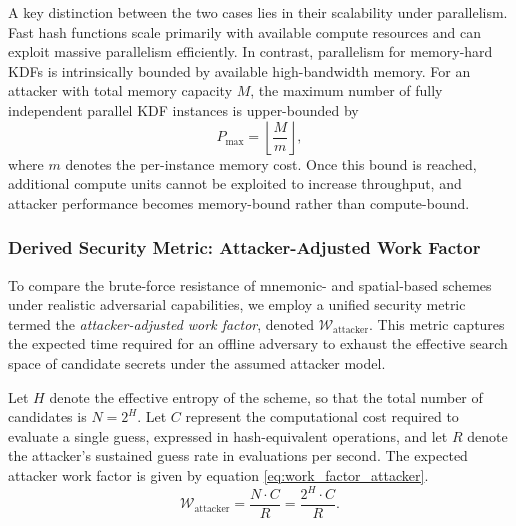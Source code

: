 \documentclass[journal,article,submit,pdftex,moreauthors]{Definitions/mdpi}
\begin{document}
A key distinction between the two cases lies in their scalability under parallelism. Fast hash functions scale primarily with available compute resources and can exploit massive parallelism efficiently. In contrast, parallelism for memory-hard KDFs is intrinsically bounded by available high-bandwidth memory. For an attacker with total memory capacity $M$, the maximum number of fully independent parallel KDF instances is upper-bounded by
\[
P_{\max} = \left\lfloor \frac{M}{m} \right\rfloor ,
\]
where $m$ denotes the per-instance memory cost. Once this bound is reached, additional compute units cannot be exploited to increase throughput, and attacker performance becomes memory-bound rather than compute-bound.

\subsubsection{Derived Security Metric: Attacker-Adjusted Work Factor}

To compare the brute-force resistance of mnemonic- and spatial-based schemes under realistic adversarial capabilities, we employ a unified security metric termed the \emph{attacker-adjusted work factor}, denoted $\mathcal{W}_{\text{attacker}}$. This metric captures the expected time required for an offline adversary to exhaust the effective search space of candidate secrets under the assumed attacker model.

Let $H$ denote the effective entropy of the scheme, so that the total number of candidates is $N = 2^{H}$. Let $C$ represent the computational cost required to evaluate a single guess, expressed in hash-equivalent operations, and let $R$ denote the attacker’s sustained guess rate in evaluations per second. The expected attacker work factor is given by equation \ref{eq:work_factor_attacker}.
\begin{equation}
\mathcal{W}_{\text{attacker}} = \frac{N \cdot C}{R} = \frac{2^{H} \cdot C}{R}.
\label{eq:work_factor_attacker}
\end{equation}
\end{document}
